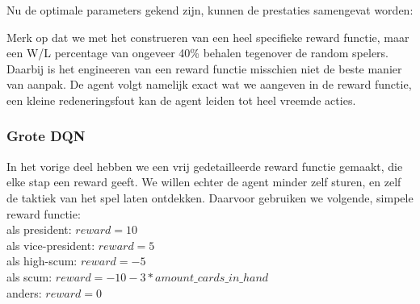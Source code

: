 \documentclass[11pt]{article}
\begin{document}
Nu de optimale parameters gekend zijn, kunnen de prestaties samengevat worden:
\begin{table}[H]
        \centering
        \caption{gemiddelde W/L in \% voor DQN agent met $\gamma=0.5$, $lr=0.0001$}
\end{table}
\noindent Merk op dat we met het construeren van een heel specifieke reward functie, maar een W/L percentage van ongeveer 40\% behalen tegenover de random spelers. Daarbij is het engineeren van een reward functie misschien niet de beste manier van aanpak. De agent volgt namelijk exact wat we aangeven in de reward functie, een kleine redeneringsfout kan de agent leiden tot heel vreemde acties.
\subsubsection{Grote DQN}
In het vorige deel hebben we een vrij gedetailleerde reward functie gemaakt, die elke stap een reward geeft. We willen echter de agent minder zelf sturen, en zelf de taktiek van het spel laten ontdekken. Daarvoor gebruiken we volgende, simpele reward functie:\\
\indent als president: $reward = 10$\\
\indent als vice-president: $reward = 5$\\
\indent als high-scum: $reward = -5$\\
\indent als scum: $reward = -10 - 3*amount\_cards\_in\_hand$\\
\indent anders: $reward = 0$\\
\end{document}
